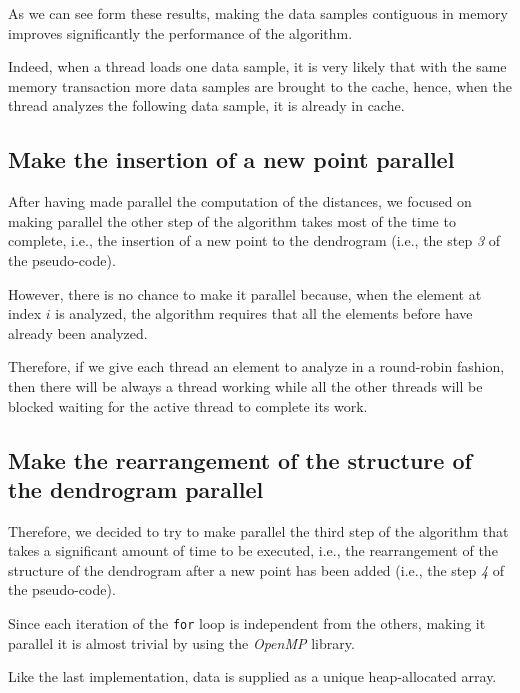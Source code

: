 \documentclass{article}
\begin{document}
As we can see form these results, making the data samples contiguous in memory improves
significantly the performance of the algorithm.

Indeed, when a thread loads one data sample, it is very likely that with the same memory
transaction more data samples are brought to the cache, hence, when the thread analyzes the
following data sample, it is already in cache.

\hypertarget{stage-3-parallel}{
\subsection{Make the insertion of a new point parallel}
\label{stage-3-parallel}}

After having made parallel the computation of the distances, we focused on making parallel the other
step of the algorithm takes most of the time to complete, i.e., the insertion of a new point to
the dendrogram (i.e., the step \textit{3} of the pseudo-code).

However, there is no chance to make it parallel because, when the element at index $i$ is
analyzed, the algorithm requires that all the elements before have already been analyzed.

Therefore, if we give each thread an element to analyze in a round-robin fashion, then there will
be always a thread working while all the other threads will be blocked waiting for the active
thread to complete its work.

\hypertarget{stage-4-parallel}{
\subsection{Make the rearrangement of the structure of the dendrogram parallel}
\label{stage-4-parallel}}

Therefore, we decided to try to make parallel the third step of the algorithm that takes a
significant amount of time to be executed, i.e., the rearrangement of the structure of the
dendrogram after a new point has been added (i.e., the step \textit{4} of the pseudo-code).

Since each iteration of the \texttt{for} loop is independent from the others, making it parallel
it is almost trivial by using the \emph{OpenMP} library.

Like the last implementation, data is supplied as a unique heap-allocated array.
\end{document}
